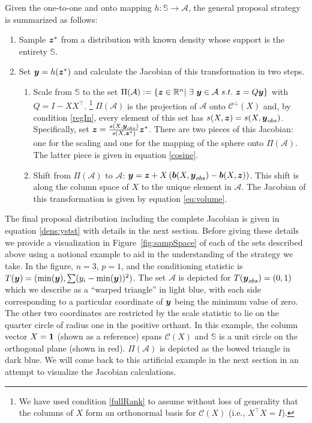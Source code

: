 \documentclass[ba]{imsart}
\newcommand{\by}{\mbox{\boldmath $y$}}
\newcommand{\bz}{\mbox{\boldmath $z$}}
\newcommand{\bb}{\mbox{\boldmath $b$}}
\newcommand{\mc}{\mathcal}
\newcommand{\response}[1]{{\color{blue}#1}}
\begin{document}
Given the one-to-one and onto mapping $h: \mathbb{S} \rightarrow \mathcal{A}$, the general proposal strategy is summarized as follows:
\begin{enumerate}
\item Sample $\bz^*$ from a distribution with known density \response{whose support is the entirety} $\mathbb{S}$.
\item Set $\by = h(\bz^*)$ and calculate the Jacobian of this transformation in two steps.
\begin{enumerate}
\item Scale from $\mathbb{S}$ to the set $\Pi(\mathcal{A}):= \{\bz\in \mathbb{R}^n |\ \exists\ \by\in \mathcal{A}\ s.t.\ \bz=Q \by \}$ with $Q = I - XX^{\top}$. \footnote{We have used condition \ref{fullRank} to assume  without loss of generality  that the columns of $X$ form an orthonormal basis for $\mc{C}(X)$ (i.e., $X^\top X=I$).} $\Pi(\mathcal{A})$ is the projection of $\mathcal{A}$ onto $\mathcal{C}^{\perp}(X)$ and, by condition \ref{regIn}, every element of this set has $s(X, \bz) = s(X, \by_{obs})$. Specifically, set $\bz=\frac{s(X,\boldsymbol{y}_{obs})}{s(X, \boldsymbol{z}^{*})}\bz^{*}$. There are two pieces of this Jacobian: one for the scaling and one for the mapping of the sphere onto $\Pi(\mathcal{A})$. The latter piece is given in equation \eqref{cosine}.
\item Shift  from $\Pi(\mathcal{A})$ to $\mathcal{A}$: $\by=\bz+X\left(\bb(X, \by_{obs})-\bb(X, \bz)\right)$. This shift is along the column space of $X$ to the unique element in $\mathcal{A}$. The Jacobian of this transformation is given by equation \eqref{eq:volume}.
\end{enumerate}
\end{enumerate}

The final proposal distribution including the complete Jacobian is given in equation \eqref{dens:ystst} with details in the next section. Before giving these details we provide a visualization  in Figure~\ref{fig:sampSpace} of each of the sets described above using a notional example to aid in the understanding of the strategy we take. In the figure, $n = 3$, $p=1$, and the conditioning statistic is $T(\by)=(\min(\by), \sum (y_i - \min(\by))^2)$. The set $\mathcal{A}$ is depicted for $T(\by_{obs})=(0,1)$ which we describe as a ``warped triangle'' in light blue, with each side corresponding to a particular coordinate of $\by$ being the minimum value of zero. The other two coordinates are restricted by the scale statistic to lie on the quarter circle of radius one in the positive orthant. In this example, the column vector $X=\bf{1}$ (shown as a reference) spans $\mc{C}(X)$  and $\mathbb{S}$ is a unit circle on the orthogonal plane (shown in red). $\Pi(\mathcal{A})$ is depicted as the bowed triangle in dark blue. We will come back to this artificial example in the next section in an attempt to visualize the Jacobian calculations.
\end{document}
